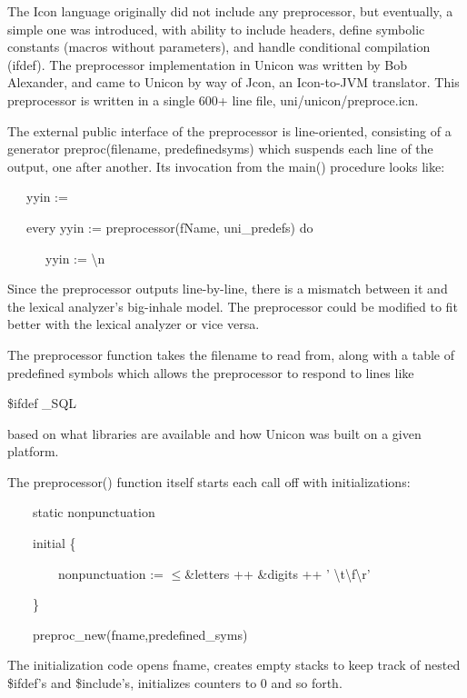 The Icon language originally did not include any preprocessor, but
eventually, a simple one was introduced, with ability to include
headers, define symbolic constants (macros without parameters), and
handle conditional compilation (ifdef).  The preprocessor
implementation in Unicon was written by Bob Alexander, and came to
Unicon by way of Jcon, an Icon-to-JVM translator. This preprocessor is
written in a single 600+ line file, uni/unicon/preproce.icn.

The external public interface of the preprocessor is line-oriented,
consisting of a generator preproc(filename, predefinedsyms) which
suspends each line of the output, one after another. Its invocation
from the main() procedure looks like:

{\ttfamily\mdseries
\ \ \ yyin := {\textquotedbl}{\textquotedbl}}

{\ttfamily\mdseries
\ \ \ every yyin {\textbar}{\textbar}:= preprocessor(fName, uni\_predefs) do}

{\ttfamily\mdseries
\ \ \ \ \ \ yyin {\textbar}{\textbar}:= {\textquotedbl}{\textbackslash}n{\textquotedbl}}


Since the preprocessor outputs line-by-line, there is a mismatch
between it and the lexical analyzer's big-inhale model.  The
preprocessor could be modified to fit better with the lexical analyzer
or vice versa.

The preprocessor function takes the filename to read from, along with
a table of predefined symbols which allows the preprocessor to respond
to lines like

{\ttfamily\mdseries
\$ifdef \_SQL}

\noindent based on what libraries are available and how Unicon was
built on a given platform.

The preprocessor() function itself starts each call off with initializations: 

{\ttfamily\mdseries
\ \ \ \ static nonpunctuation}

{\ttfamily\mdseries
\ \ \ \ initial \{}

{\ttfamily\mdseries
\ \ \ \ \ \ \ \ nonpunctuation := ${\leq}$\&letters ++ \&digits ++ '
{\textbackslash}t{\textbackslash}f{\textbackslash}r'}

{\ttfamily\mdseries
\ \ \ \ \}}


\bigskip

{\ttfamily\mdseries
\ \ \ \ preproc\_new(fname,predefined\_syms)}

The initialization code opens fname, creates empty stacks to keep
track of nested \$ifdef's and \$include's, initializes counters to 0
and so forth.

